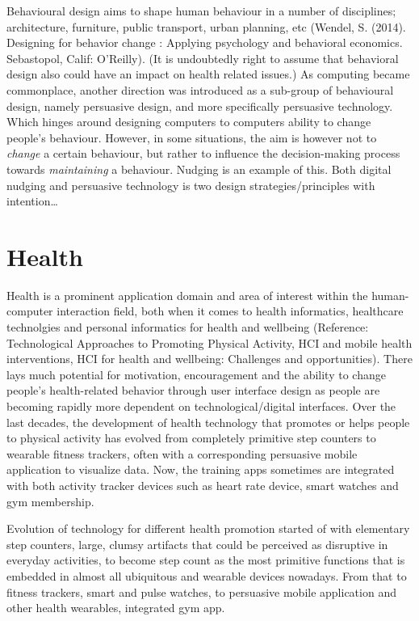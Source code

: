 Behavioural design aims to shape human behaviour in a number of disciplines; architecture, furniture, public transport, urban planning, etc (Wendel, S. (2014). Designing for behavior change : Applying psychology and behavioral economics. Sebastopol, Calif: O'Reilly). (It is undoubtedly right to assume that behavioral design also could have an impact on health related issues.) As computing became commonplace, another direction was introduced as a sub-group of behavioural design, namely persuasive design, and more specifically persuasive technology. Which hinges around designing computers to computers ability to change people's behaviour.  However, in some situations, the aim is however not to \textit{change} a certain behaviour, but rather to influence the decision-making process towards \textit{maintaining} a behaviour. Nudging is an example of this. Both digital nudging and persuasive technology is two design strategies/principles with intention… 




\section{Health}
Health is a prominent application domain and area of interest within the human-computer interaction field, both when it comes to health informatics, healthcare technolgies and personal informatics for health and wellbeing (Reference: Technological Approaches to Promoting Physical Activity, HCI and mobile health interventions, HCI for health and wellbeing: Challenges and opportunities). There lays much potential for motivation, encouragement and the ability to change people’s health-related behavior through user interface design as people are becoming rapidly more dependent on technological/digital interfaces. Over the last decades, the development of health technology that promotes or helps people to physical activity has evolved from completely primitive step counters to wearable fitness trackers, often with a corresponding persuasive mobile application to visualize data. Now, the training apps sometimes are integrated with both activity tracker devices  such as heart rate device, smart watches and gym membership. 

Evolution of technology for different health promotion started of with elementary step counters, large, clumsy artifacts that could be perceived as disruptive in everyday activities, to become step count as the most primitive functions that is embedded in almost all ubiquitous and wearable devices nowadays. From that to fitness trackers, smart and pulse watches, to persuasive mobile application and other health wearables, integrated gym app.

